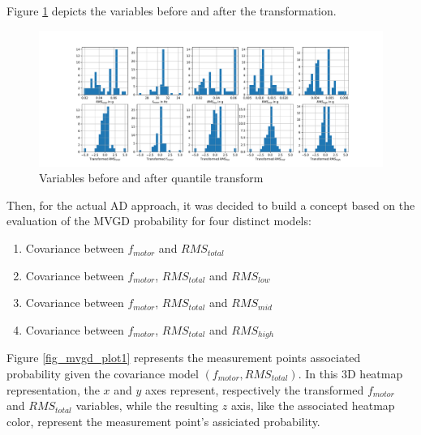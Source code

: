 \documentclass[conference]{IEEEtran}
\begin{document}
Figure \ref{fig_transform_result} depicts the variables before and after the transformation.


\begin{figure}[htbp]
\centerline{\includegraphics[width=\columnwidth]{graphics/quantile_transform_data/quantile_transform_data.pdf}}
\caption{Variables before and after quantile transform}
\label{fig_transform_result}
\end{figure}


Then, for the actual AD approach, it was decided to build a concept based on the evaluation of the MVGD probability for four distinct models:

\begin{enumerate}
	\item Covariance between $f_{motor}$ and $RMS_{total}$
	\item Covariance between $f_{motor}$, $RMS_{total}$ and $RMS_{low}$
	\item Covariance between $f_{motor}$, $RMS_{total}$ and $RMS_{mid}$
	\item Covariance between $f_{motor}$, $RMS_{total}$ and $RMS_{high}$
\end{enumerate}


Figure \ref{fig_mvgd_plot1} represents the measurement points associated probability given the covariance model $(f_{motor},RMS_{total})$. In this 3D heatmap representation, the $x$ and $y$ axes represent, respectively the transformed $f_{motor}$ and $RMS_{total}$ variables, while the resulting $z$ axis, like the associated heatmap color, represent the measurement point's assiciated probability.

\end{document}
